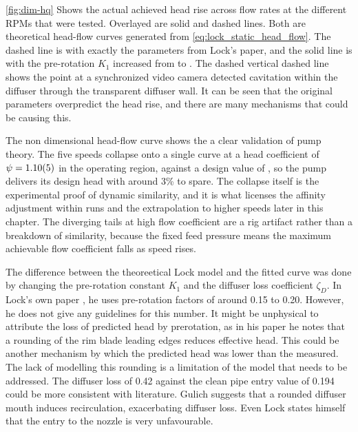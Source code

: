 

\cref{fig:dim-hq} Shows the actual achieved head rise across flow rates at the different RPMs that were tested. Overlayed are solid and dashed lines. Both are theoretical head-flow curves generated from \cref{eq:lock_static_head_flow}. The dashed line is with exactly the parameters from Lock's paper, and the solid line is with the pre-rotation $K_1$ increased from \valLockKOneOriginal to \valLockKOneModified. The dashed vertical dashed line shows the point at a synchronized video camera detected cavitation within the diffuser through the transparent diffuser wall. It can be seen that the original parameters overpredict the head rise, and there are many mechanisms that could be causing this.

The non dimensional head-flow curve shows the a clear validation of pump theory. The five speeds collapse onto a single curve at a head coefficient of $\psi = \num{1.10 +- 0.05}$ in the operating region, against a design value of \valPumpPsiDesign, so the pump delivers its design head with around 3\% to spare. The collapse itself is the experimental proof of dynamic similarity, and it is what licenses the affinity adjustment within runs and the extrapolation to higher speeds later in this chapter. The diverging tails at high flow coefficient are a rig artifact rather than a breakdown of similarity, because the fixed feed pressure means the maximum achievable flow coefficient falls as speed rises.

The difference between the theoreetical Lock model and the fitted curve was done by changing the pre-rotation constant $K_1$ and the diffuser loss coefficient $\zeta_D$. In Lock's own paper \cite{lockForcedVortexPump1966}, he uses pre-rotation factors of around 0.15 to 0.20. However, he does not give any guidelines for this number. It might be unphysical to attribute the loss of predicted head by prerotation, as in his paper he notes that a rounding of the rim blade leading edges reduces effective head. This could be another mechanism by which the predicted head was lower than the measured. The lack of modelling this rounding is a limitation of the model that needs to be addressed. The diffuser loss of 0.42 against the clean pipe entry value of 0.194 could be more consistent with literature. Gulich suggests that a rounded diffuser mouth induces recirculation, exacerbating diffuser loss. Even Lock states himself that the entry to the nozzle is very unfavourable.

